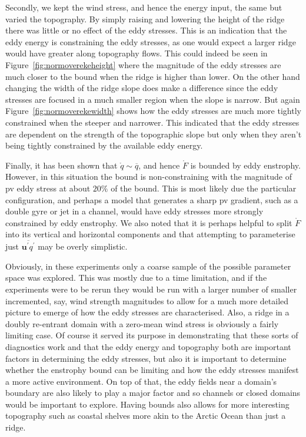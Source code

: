 \documentclass[12pt,a4paper]{report}
\newcommand*\thkmean[1]{\overline{#1}}
\newcommand*\thkres[1]{{#1}^{\prime}}
\newcommand*\spec[1]{\mathring{#1}}
\newcommand*\figref[1]{Figure~\ref{#1}}
\begin{document}
Secondly, we kept the wind stress, and hence the energy input, the same but varied
the topography. By simply raising and lowering the height of the ridge there was
little or no effect of the eddy stresses. This is an indication that the eddy energy 
is constraining the eddy stresses, as one would expect a larger ridge would have
greater along topography flows. This could indeed be seen in \figref{fig:normoverekeheight}
where the magnitude of the eddy stresses are much closer to the bound when the ridge is
 higher than lower. On the other hand changing the width of the ridge slope does make
 a difference since the eddy stresses are focused in a much smaller region when the slope is narrow. But again \figref{fig:normoverekewidth} shows how the eddy stresses are much
 more tightly constrained when the steeper and narrower. This indicated that the eddy
 stresses are dependent on the  strength of the topographic slope but only when they aren't being tightly constrained by the available eddy energy.
 
 Finally, it has been shown that $\spec{q} \sim \thkmean{q}$, and hence $\spec{F}$ is 
 bounded by eddy enstrophy. However, in this situation the bound is non-constraining with
 the magnitude of \gls{pv} eddy  stress at about $20\%$ of the bound. This is most likely
 due the particular configuration, and perhaps a model that generates a sharp \gls{pv}
 gradient, such as a double gyre or jet in a channel, would have eddy stresses more 
 strongly constrained by eddy enstrophy. We also noted that it is perhaps helpful to 
 split $\spec{F}$ into its vertical and horizontal components and that attempting
 to parameterise just $\thkmean{\thkres{\boldsymbol{u}}\thkres{q}}$ may be overly simplistic.

 Obviously, in these experiments only a coarse sample of the possible parameter space was
  explored. This was mostly due to a time limitation, and if the experiments were to be 
  rerun they would be run with a larger number of smaller incremented, say, wind strength
  magnitudes to allow for a much more detailed picture to emerge of how the eddy stresses
  are characterised. Also, a ridge in a doubly re-entrant domain with a zero-mean wind
  stress is obviously a fairly limiting case. Of course it served its purpose
  in demonstrating that these sorts of diagnostics work and that the eddy
  energy and topography both are important factors in determining the eddy stresses, but
  also it is important to determine whether the enstrophy bound can be limiting 
  and how the eddy stresses manifest a more active environment. On top of that, 
  the eddy fields near a domain's boundary are also likely to play a major 
  factor and so channels or closed domains would be important to explore.
  Having bounds also allows for more interesting topography such as 
  coastal shelves more akin to the Arctic Ocean than just a ridge. 
  
\end{document}
